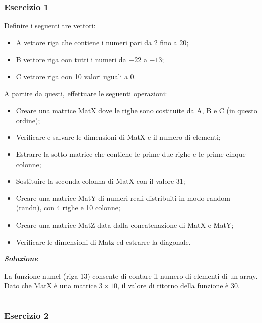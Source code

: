 \documentclass[a4paper]{article}
\newcommand{\longline}{\noindent\rule{\textwidth}{0.4pt}}
\begin{document}
	\subsubsection{Esercizio 1}
	
	Definire i seguenti tre vettori:
	\begin{itemize}
		\item A vettore riga che contiene i numeri pari da 2 fino a 20;
		\item B vettore riga con tutti i numeri da $-22$ a $-13$;
		\item C vettore riga con 10 valori uguali a 0.
	\end{itemize}
	A partire da questi, effettuare le seguenti operazioni:
	\begin{itemize}
		\item Creare una matrice \textsf{MatX} dove le righe sono costituite da \textsf{A}, \textsf{B} e \textsf{C} (in questo ordine);
		\item Verificare e salvare le dimensioni di \textsf{MatX} e il numero di elementi;
		\item Estrarre la sotto-matrice che contiene le prime due righe e le prime cinque colonne;
		\item Sostituire la seconda colonna di \textsf{MatX} con il valore $31$;
		\item Creare una matrice \textsf{MatY} di numeri reali distribuiti in modo random (\textsf{randn}), con 4 righe e 10 colonne;
		\item Creare una matrice \textsf{MatZ} data dalla concatenazione di \textsf{MatX} e \textsf{MatY};
		\item Verificare le dimensioni di \textsf{Matz} ed estrarre la diagonale.
	\end{itemize}

	\noindent
	\textcolor{Green4}{\textbf{\underline{\emph{Soluzione}}}}\newline
	
	\noindent
	
	La funzione \textsf{numel} (riga 13) consente di contare il numero di elementi di un array. Dato che \textsf{MatX} è una matrice $3 \times 10$, il valore di ritorno della funzione è $30$.
	
	\longline
	
	\subsubsection{Esercizio 2}
	
\end{document}
